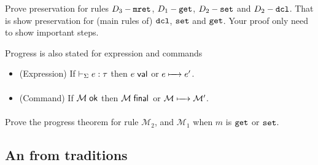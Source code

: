 \documentclass[11pt]{article}
\begin{document}
 Prove preservation for rules $\RDynIOf{3}{\kw{mret}}$, $\RDynIOf{1}{\kw{get}}$, $\RDynIOf{2}{\kw{set}}$ and $\RDynIOf{2}{\kw{dcl}}$.
That is show preservation for (main rules of) $\kw{dcl}$, $\kw{set}$ and $\kw{get}$. Your proof only need to show
important steps.


\begin{theorem}[Progress] Progress is also stated for expression and commands
\begin{itemize}
\item (Expression) If $\entails[\Sigma]{\IsOf{e}{\tau}}$ then $\IsVal{e}$ or $e \StepsTo{} e'$.
\item (Command) If $\IsOK{\mathcal{M}}$ then $\IsFinal{\mathcal{M}}$ or $\mathcal{M} \StepsTo{} \mathcal{M}'$.
\end{itemize}
\end{theorem}

 Prove the progress theorem for rule $\mathcal{M}_2$, and $\mathcal{M}_1$ when $m$ is $\kw{get}$ or $\kw{set}$.


\subsection{An  from traditions}




\end{document}
